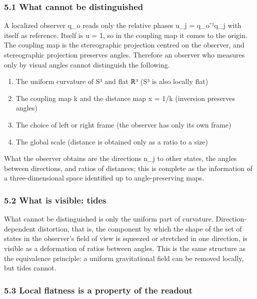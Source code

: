 \documentclass[
  a4paper,
]{article}
\providecommand{\tightlist}{%
  \setlength{\itemsep}{0pt}\setlength{\parskip}{0pt}}
\begin{document}
\subsubsection{5.1 What cannot be
distinguished}\label{what-cannot-be-distinguished}

A localized observer q\_o reads only the relative phases u\_j =
q\_o⁻¹q\_j with itself as reference. Itself is u = 1, so in the coupling
map it comes to the origin. The coupling map is the stereographic
projection centred on the observer, and stereographic projection
preserves angles. Therefore an observer who measures only by visual
angles cannot distinguish the following.

\begin{enumerate}
\def\labelenumi{\arabic{enumi}.}
\tightlist
\item
  The uniform curvature of S³ and flat ℝ³ (S³ is also locally flat)
\item
  The coupling map k and the distance map x = 1/k (inversion preserves
  angles)
\item
  The choice of left or right frame (the observer has only its own
  frame)
\item
  The global scale (distance is obtained only as a ratio to a size)
\end{enumerate}

What the observer obtains are the directions n\_j to other states, the
angles between directions, and ratios of distances; this is complete as
the information of a three-dimensional space identified up to
angle-preserving maps.

\subsubsection{5.2 What is visible: tides}\label{what-is-visible-tides}

What cannot be distinguished is only the uniform part of curvature.
Direction-dependent distortion, that is, the component by which the
shape of the set of states in the observer's field of view is squeezed
or stretched in one direction, is visible as a deformation of ratios
between angles. This is the same structure as the equivalence principle:
a uniform gravitational field can be removed locally, but tides cannot.

\subsubsection{5.3 Local flatness is a property of the
readout}\label{local-flatness-is-a-property-of-the-readout}
\end{document}
